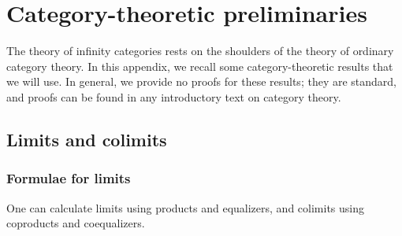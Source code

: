 \documentclass[main.tex]{subfiles}
\begin{document}
\chapter{Category-theoretic preliminaries}
\label{ch:category_theoretic_preliminaries}

The theory of infinity categories rests on the shoulders of the theory of ordinary category theory. In this appendix, we recall some category-theoretic results that we will use. In general, we provide no proofs for these results; they are standard, and proofs can be found in any introductory text on category theory. 

\section{Limits and colimits}
\label{sec:limits_and_colimits}

\subsection{Formulae for limits}
\label{ssc:formulae_for_limits}

One can calculate limits using products and equalizers, and colimits using coproducts and coequalizers.
\end{document}
